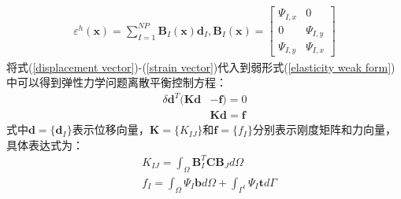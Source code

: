 \begin{equation}\label{strain vector}
\begin{split}
    \varepsilon^h(\pmb{x})=\sum_{I=1}^{N\!P}\pmb{B}_I(\pmb{x})\pmb{d}_I,\pmb{B}_I(\pmb{x})= \left[\begin{matrix}\Psi_{I,x}&0\\0&\Psi_{I,y}\\\Psi_{I,y}&\Psi_{I,x} \end{matrix}\right] 
\end{split}
\end{equation}
将式(\ref{displacement vector})-(\ref{strain vector})代入到弱形式(\ref{elasticity weak form})中可以得到弹性力学问题离散平衡控制方程：
\begin{equation}
\begin{split}
    \delta\pmb{d}^T(\pmb{K}\pmb{d}&-\pmb{f})=0\\
    &\pmb{K}\pmb{d}=\pmb{f}
\end{split}
\end{equation}
式中$\pmb{d}=\{\pmb d_I\}$表示位移向量，$\pmb{K}=\{K_{I\!J}\}$和$\pmb{f}=\{f_I\}$分别表示刚度矩阵和力向量，具体表达式为：
\begin{equation}
\begin{split}\label{EKf}
        &K_{I\!J}=\int_{\Omega}\pmb{B}_I^T\pmb{C}\pmb{B}_Jd\Omega\\
        &f_I=\int_{\Omega}\Psi_I\pmb{b}d\Omega+\int_{\Gamma^t}\Psi_I\pmb{t}d\Gamma
\end{split}
\end{equation}
